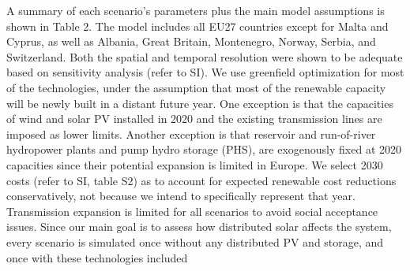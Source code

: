 \documentclass[review]{elsarticle}
\begin{document}
	
	A summary of each scenario’s parameters plus the main model assumptions is shown in Table 2. The model includes all EU27 countries except for Malta and Cyprus, as well as Albania, Great Britain, Montenegro, Norway, Serbia, and Switzerland. Both the spatial and temporal resolution were shown to be adequate based on sensitivity analysis (refer to SI). We use greenfield optimization for most of the technologies, under the assumption that most of the renewable capacity will be newly built in a distant future year. One exception is that the capacities of wind and solar PV installed in 2020 and the existing transmission lines are imposed as lower limits. Another exception is that reservoir and run-of-river hydropower plants and pump hydro storage (PHS), are exogenously fixed at 2020 capacities since their potential expansion is limited in Europe. We select 2030 costs (refer to SI, table S2) as to account for expected renewable cost reductions conservatively, not because we intend to specifically represent that year. Transmission expansion is limited for all scenarios to avoid social acceptance issues. Since our main goal is to assess how distributed solar affects the system, every scenario is simulated once without any distributed PV and storage, and once with these technologies included
	
\end{document}
